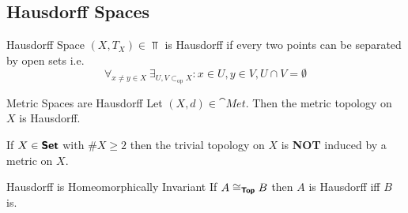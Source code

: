 \subsection{Hausdorff Spaces}

\begin{definition}{Hausdorff Space}{}
    $(X,T_X)\in\Top$ is Hausdorff if every two points can be separated by open sets i.e. \[
    \forall_{x\neq y\in X} \ \exists_{U,V\subset_{\text{op}}X}:x\in U,y\in V,U\cap V=\emptyset
    \]
\end{definition}

\begin{theorem}{Metric Spaces are Hausdorff}{}
    Let $(X,d)\in\cat{Met}$. Then the metric topology on $X$ is Hausdorff.
\end{theorem}

\begin{corollary}{}{}
    If $X\in\bm{\mathsf{Set}}$ with $\# X\geq 2$ then the trivial topology on $X$ is \textbf{NOT} induced by a metric on $X$.
\end{corollary}

\begin{theorem}{Hausdorff is Homeomorphically Invariant}{}
    If $A\cong_{\bm{\mathsf{Top}}}B$ then $A$ is Hausdorff iff $B$ is.
\end{theorem}
